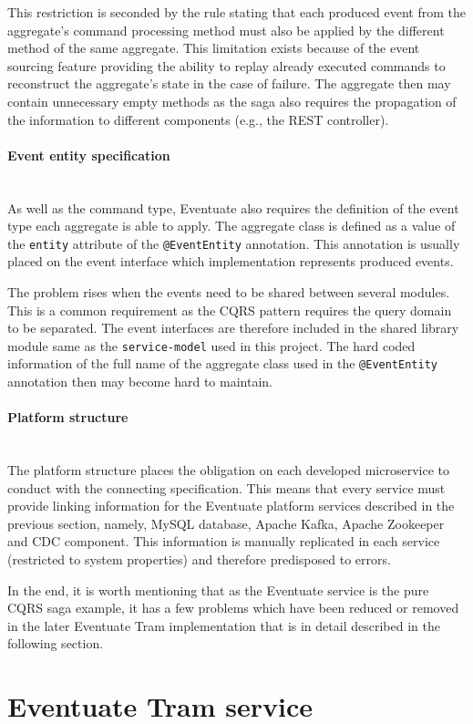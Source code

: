 \documentclass[oneside,
  digital, %
  table,   %
  lof,     %
  lot,     %
]{fithesis3}
\newcommand{\newlinepar}[1]{\paragraph{#1}\needspace{3\baselineskip}\mbox{}\\}
\begin{document}
This restriction is seconded by the rule stating that each produced event from the aggregate's command processing method must also be applied by the different method of the same aggregate. This limitation exists because of the event sourcing feature providing the ability to replay already executed commands to reconstruct the aggregate's state in the case of failure. The aggregate then may contain unnecessary empty methods as the saga also requires the propagation of the information to different components (e.g., the REST controller).


\newlinepar{Event entity specification}

As well as the command type, Eventuate also requires the definition of the event type each aggregate is able to apply. The aggregate class is defined as a value of the \texttt{entity} attribute of the \texttt{@EventEntity} annotation. This annotation is usually placed on the event interface which implementation represents produced events.

The problem rises when the events need to be shared between several modules. This is a common requirement as the CQRS pattern requires the query domain to be separated. The event interfaces are therefore included in the shared library module same as the \texttt{service-model} used in this project. The hard coded information of the full name of the aggregate class used in the \texttt{@EventEntity} annotation then may become hard to maintain.

\newlinepar{Platform structure}

The platform structure places the obligation on each developed microservice to conduct with the connecting specification. This means that every service must provide linking information for the Eventuate platform services described in the previous section, namely, MySQL database, Apache Kafka, Apache Zookeeper and CDC component. This information is manually replicated in each service (restricted to system properties) and therefore predisposed to errors.

\hfill \break

In the end, it is worth mentioning that as the Eventuate service is the pure CQRS saga example, it has a few problems which have been reduced or removed in the later Eventuate Tram implementation that is in detail described in the following section. 


\section{Eventuate Tram service}
\end{document}
